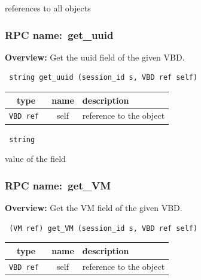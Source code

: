 references to all objects
\vspace{0.3cm}
\vspace{0.3cm}
\vspace{0.3cm}
\subsubsection{RPC name:~get\_uuid}

{\bf Overview:} 
Get the uuid field of the given VBD.

\begin{verbatim} string get_uuid (session_id s, VBD ref self)\end{verbatim}



 
\vspace{0.3cm}
\begin{tabular}{|c|c|p{7cm}|}
 \hline
{\bf type} & {\bf name} & {\bf description} \\ \hline
{\tt VBD ref } & self & reference to the object \\ \hline 

\end{tabular}

\vspace{0.3cm}

{\tt 
string
}


value of the field
\vspace{0.3cm}
\vspace{0.3cm}
\vspace{0.3cm}
\subsubsection{RPC name:~get\_VM}

{\bf Overview:} 
Get the VM field of the given VBD.

\begin{verbatim} (VM ref) get_VM (session_id s, VBD ref self)\end{verbatim}



 
\vspace{0.3cm}
\begin{tabular}{|c|c|p{7cm}|}
 \hline
{\bf type} & {\bf name} & {\bf description} \\ \hline
{\tt VBD ref } & self & reference to the object \\ \hline 

\end{tabular}


